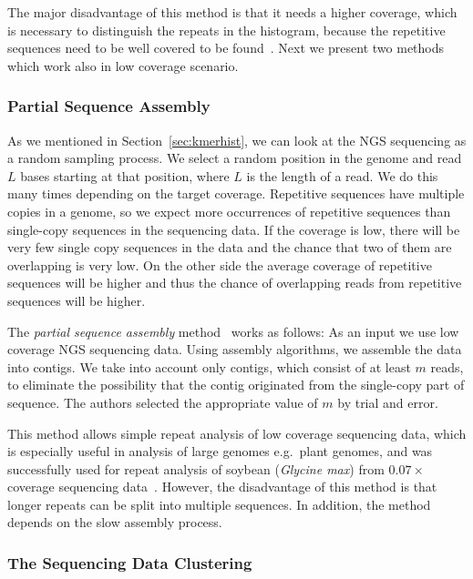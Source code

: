 The major disadvantage of this method is that it needs a higher coverage, which is necessary to distinguish the repeats in the histogram, because the repetitive sequences need to be well covered to be found~\cite{waterman}.
Next we present two methods which work also in low coverage scenario.

\subsubsection{Partial Sequence Assembly}

As we mentioned in Section~\ref{sec:kmerhist}, we can look at the NGS sequencing as a random sampling process. We select a random position in the genome and read $L$ bases starting at that position, where $L$ is the length of a read. We do this many times depending on the target coverage.
Repetitive sequences have multiple copies in a genome, so we expect more occurrences of repetitive sequences than single-copy sequences in the sequencing data. If the coverage is low, there will be very few single copy sequences in the data and the chance that two of them are overlapping is very low. On the other side the average coverage of repetitive sequences will be higher and thus the chance of overlapping reads from repetitive sequences will be higher.

The \emph{partial sequence assembly} method~\cite{swaminathan2007global} works as follows: As an input we use low coverage NGS sequencing data. Using assembly algorithms, we assemble the data into contigs. We take into account only contigs, which consist of at least $m$ reads, to eliminate the possibility that the contig originated from the single-copy part of sequence. The authors selected the appropriate value of $m$ by trial and error.

This method allows simple repeat analysis of low coverage sequencing data, which is especially useful in analysis of large genomes e.g.\ plant genomes, and was successfully used for repeat analysis of soybean (\textit{Glycine max}) from $0.07\times$ coverage sequencing data~\cite{swaminathan2007global}.
However, the disadvantage of this method is that longer repeats can be split into multiple sequences. In addition, the method depends on the slow assembly process.

\subsubsection{The Sequencing Data Clustering}

